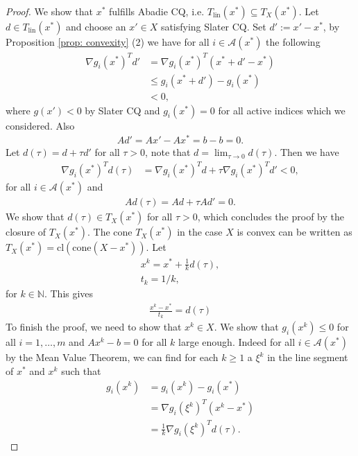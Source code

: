 \begin{proof}
We show that $x^{*}$ fulfills Abadie CQ, i.e. $T_{\text{lin}}(x^{*})
\subseteq T_X(x^{*})$. Let $d \in T_{\text{lin}}(x^{*})$ and choose an $x'
\in X$ satisfying Slater CQ. Set $d' := x' - x^{*}$, by Proposition
\ref{prop: convexity} (2) we have for all $i \in \mathcal{A}(x^{*})$ the
following
\begin{align}
    \nabla g_i(x^{*})^{T} d'
    &= \nabla g_i(x^{*})^{T} (x^{*} + d' - x^{*} )\\
    &\le g_i(x^{*} +d') -g_i(x^{*}) \\
    &< 0,
\end{align}
where $g(x') < 0$ by Slater CQ and $g_i(x^{*}) = 0$ for all active indices
which we considered. Also
\begin{align}
    Ad' = Ax' - Ax^{*} = b - b = 0.
\end{align}
Let $d(\tau) = d+ \tau d'$ for all $\tau >0$, note that $d = \lim_{\tau \to
0}d(\tau)$. Then we have
\begin{align}
    \nabla g_i(x^{*})^{T} d(\tau)
    &= \nabla g_i (x^{*})^{T} d + \tau \nabla g_i(x^{*})^{T} d' < 0,
\end{align}
for all $i \in \mathcal{A}(x^{*})$ and
\begin{align}
    Ad(\tau) = Ad + \tau Ad' = 0.
\end{align}
We show that $d(\tau) \in T_X(x^{*})$ for all $\tau >0 $, which concludes
the proof by the closure of $T_X(x^{*})$. The cone $T_X(x^{*})$ in the case
$X$ is convex can be written as $T_X(x^{*}) = \text{cl}(\text{cone}(X-x^{*}))$. Let
\begin{align}
    x^{k}  = x^{*} + \frac{1}{k}d(\tau),\\
    t_k = 1/k,
\end{align}
for $k \in \mathbb{N}$. This gives
\begin{align}
    \frac{x^{k} - x^{*}  }{t_k} = d(\tau)
\end{align}
To finish the proof, we need to show that $x^{k}  \in X$.
We show that $g_i(x^{k}) \le 0$ for all $i=1,\ldots,m$ and $Ax^{k} -b =
0$ for all $k$ large enough. Indeed for all $i \in \mathcal{A}(x^{*})$ by the
Mean Value Theorem, we can find for each $k\ge 1$ a $\xi^{k}$ in the line
segment of $x^{*}$ and $x^{k}$ such that
\begin{align}
    g_i(x^{k})
    &= g_i(x^{k}) - g_i(x^{*}) \\
    &= \nabla g_i(\xi^{k})^{T} (x^{k} -x^{*} ) \\
    &= \frac{1}{k} \nabla g_i (\xi^{k})^{T} d(\tau).

\end{align}
\end{proof}
